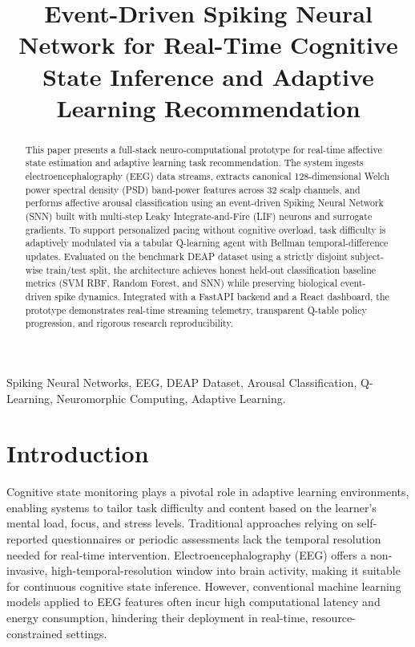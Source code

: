 \documentclass[conference]{IEEEtran}
\begin{document}
\title{Event-Driven Spiking Neural Network for Real-Time Cognitive State Inference and Adaptive Learning Recommendation}
\author{
}
\maketitle

\begin{abstract}
This paper presents a full-stack neuro-computational prototype for real-time affective state estimation and adaptive learning task recommendation. The system ingests electroencephalography (EEG) data streams, extracts canonical 128-dimensional Welch power spectral density (PSD) band-power features across 32 scalp channels, and performs affective arousal classification using an event-driven Spiking Neural Network (SNN) built with multi-step Leaky Integrate-and-Fire (LIF) neurons and surrogate gradients. To support personalized pacing without cognitive overload, task difficulty is adaptively modulated via a tabular Q-learning agent with Bellman temporal-difference updates. Evaluated on the benchmark DEAP dataset using a strictly disjoint subject-wise train/test split, the architecture achieves honest held-out classification baseline metrics (SVM RBF, Random Forest, and SNN) while preserving biological event-driven spike dynamics. Integrated with a FastAPI backend and a React dashboard, the prototype demonstrates real-time streaming telemetry, transparent Q-table policy progression, and rigorous research reproducibility.
\end{abstract}

\begin{IEEEkeywords}
Spiking Neural Networks, EEG, DEAP Dataset, Arousal Classification, Q-Learning, Neuromorphic Computing, Adaptive Learning.
\end{IEEEkeywords}

\section{Introduction}
\label{introduction}
Cognitive state monitoring plays a pivotal role in adaptive learning environments, enabling systems to tailor task difficulty and content based on the learner's mental load, focus, and stress levels. Traditional approaches relying on self-reported questionnaires or periodic assessments lack the temporal resolution needed for real-time intervention. Electroencephalography (EEG) offers a non-invasive, high-temporal-resolution window into brain activity, making it suitable for continuous cognitive state inference. However, conventional machine learning models applied to EEG features often incur high computational latency and energy consumption, hindering their deployment in real-time, resource-constrained settings.
\end{document}

